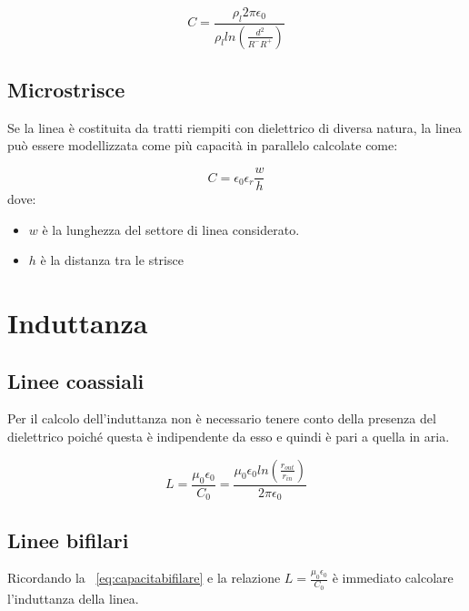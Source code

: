 \documentclass[10pt,a4paper]{report}
\begin{document}
			\begin{equation}
			C=\frac{\rho_l 2 \pi \epsilon_0}{\rho_l ln(\frac{d^2}{R^-R^+})}
			\label{eq:capacitabifilare}
			\end{equation}



		\subsection{Microstrisce}

	

	 		Se la linea è costituita da tratti riempiti con dielettrico di diversa natura, la linea può essere modellizzata come più capacità in parallelo calcolate come:

	 		\begin{equation}
			C=\epsilon_0 \epsilon_r\frac{w}{h}	 			
	 		\end{equation} 
	 		dove:
	 		\begin{itemize}
	 		\item $w$ è la lunghezza del settore di linea considerato.
	 		\item $h$ è la distanza tra le strisce
	 		\end{itemize}


	\section{Induttanza}

		\subsection{Linee coassiali}

			Per il calcolo dell’induttanza non è necessario tenere conto della presenza del dielettrico
			poiché questa è indipendente da esso e quindi è pari a quella in aria.
		
			\begin{equation}
				L=\frac{\mu_0 \epsilon_0}{C_0}=\frac{\mu_0 \epsilon_0 ln (\frac { r_{out}} {r_{in} } )}{2\pi \epsilon_0}
			\end{equation}



		\subsection{Linee bifilari}

		Ricordando la ~\ref{eq:capacitabifilare} e la relazione $L=\frac{\mu_0 \epsilon_0}{C_0}$ è immediato calcolare l'induttanza della linea.
\end{document}
